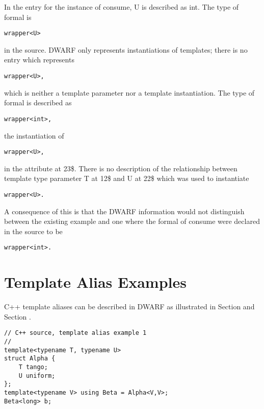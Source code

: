In the  entry for the instance of consume,
U is described as 
int. 
The type of formal is 
\begin{alltt}
wrapper<U>
\end{alltt}
 in
the source. DWARF only represents instantiations of templates;
there is no entry which represents 
\begin{alltt}
wrapper<U>, 
\end{alltt}
which is neither
a template parameter nor a template instantiation. The type
of formal is described as 
\begin{alltt}
wrapper<int>, 
\end{alltt}
the instantiation of
\begin{alltt}
wrapper<U>, 
\end{alltt}
in the  attribute at 
23\$. 
There is no
description of the relationship between template type parameter
T at 12\$ and U at 
22\$ which was used to instantiate 
\begin{alltt}
wrapper<U>.
\end{alltt}

A consequence of this is that the DWARF information would
not distinguish between the existing example and one where
the formal of consume were declared in the source to be
\begin{alltt}
wrapper<int>.
\end{alltt}

\section{Template Alias Examples}
\label{app:templatealiasexample}

C++ template aliases can be described in DWARF as illustrated in 
Section 
and 
Section .


\begin{lstlisting}
// C++ source, template alias example 1
//
template<typename T, typename U>
struct Alpha {
    T tango;
    U uniform;
};
template<typename V> using Beta = Alpha<V,V>;
Beta<long> b;
\end{lstlisting}


